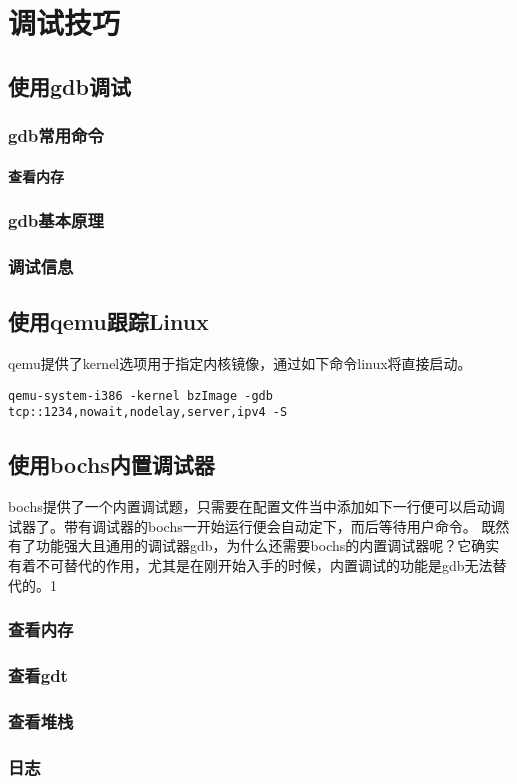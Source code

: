 \chapter{调试技巧}
\section{使用gdb调试}
\subsection{gdb常用命令}
\subsubsection{查看内存}
\subsection{gdb基本原理}
\subsection{调试信息}

\section{使用qemu跟踪Linux}
qemu提供了kernel选项用于指定内核镜像，通过如下命令linux将直接启动。
\begin{lstlisting}
qemu-system-i386 -kernel bzImage -gdb tcp::1234,nowait,nodelay,server,ipv4 -S
\end{lstlisting}

\section{使用bochs内置调试器}
bochs提供了一个内置调试题，只需要在配置文件当中添加如下一行便可以启动调试器了。带有调试器的bochs一开始运行便会自动定下，而后等待用户命令。
既然有了功能强大且通用的调试器gdb，为什么还需要bochs的内置调试器呢？它确实有着不可替代的作用，尤其是在刚开始入手的时候，内置调试的功能是gdb无法替代的。1
\subsection{查看内存}
\subsection{查看gdt}
\subsection{查看堆栈}
\subsection{日志}
